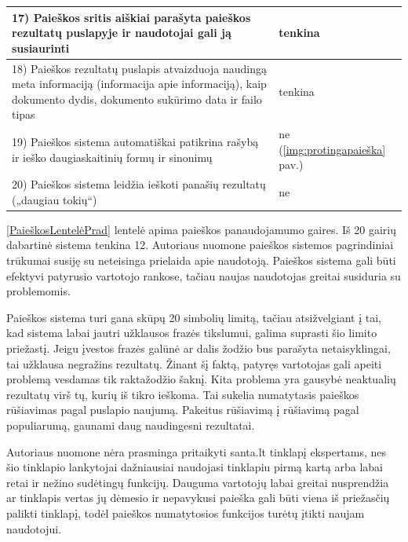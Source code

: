 \documentclass{VUMIFPSkursinis}
\begin{document}
\begin{center}
\begin{tabular}{ |p{}|p{2cm}| }
	17) Paieškos sritis aiškiai parašyta paieškos rezultatų puslapyje ir naudotojai gali ją susiaurinti & tenkina \\ \hline
	18) Paieškos rezultatų puslapis atvaizduoja naudingą meta informaciją (informacija apie informaciją), kaip dokumento dydis, dokumento sukūrimo data ir failo tipas & tenkina \\ \hline
	19) Paieškos sistema automatiškai patikrina rašybą ir ieško daugiaskaitinių formų ir sinonimų & ne (\ref{img:protingapaieška} pav.) \\ \hline
	20) Paieškos sistema leidžia ieškoti panašių rezultatų („daugiau tokių“) & ne \\ \hline
\end{tabular}
\label{PaieškosLentelėPrad}
\end{center}

\pagebreak

\ref{PaieškosLentelėPrad} lentelė apima paieškos panaudojamumo gaires. Iš 20 gairių dabartinė sistema tenkina 12. Autoriaus nuomone paieškos sistemos pagrindiniai trūkumai susiję su neteisinga prielaida apie naudotoją. Paieškos sistema gali būti efektyvi patyrusio vartotojo rankose, tačiau naujas naudotojas greitai susiduria su problemomis.

Paieškos sistema turi gana skūpų 20 simbolių limitą, tačiau atsižvelgiant į tai, kad sistema labai jautri užklausos frazės tikslumui, galima suprasti šio limito priežastį. Jeigu įvestos frazės galūnė ar dalis žodžio bus parašyta netaisyklingai, tai užklausa negražins rezultatų. Žinant šį faktą, patyręs vartotojas gali apeiti problemą vesdamas tik raktažodžio šaknį.
Kita problema yra gausybė neaktualių rezultatų virš tų, kurių iš tikro ieškoma. Tai sukelia numatytasis paieškos rūšiavimas pagal puslapio naujumą. Pakeitus rūšiavimą į rūšiavimą pagal  populiarumą, gaunami daug naudingesni rezultatai.

Autoriaus nuomone nėra prasminga pritaikyti santa.lt tinklapį ekspertams, nes šio tinklapio lankytojai dažniausiai naudojasi tinklapiu pirmą kartą arba labai retai ir nežino sudėtingų funkcijų. Dauguma vartotojų labai greitai nusprendžia ar tinklapis vertas jų dėmesio\cite{WebBehaviorsEn} ir nepavykusi paieška gali būti viena iš priežasčių palikti tinklapį, todėl paieškos numatytosios funkcijos turėtų įtikti naujam naudotojui.
\end{document}
